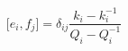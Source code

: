 \begin{equation}
\lbrack e_{i},f_{j}]=\delta _{ij}\frac{k_{i}-k_{i}^{-1}}{Q_{i}-Q_{i}^{-1}}
\end{equation}

